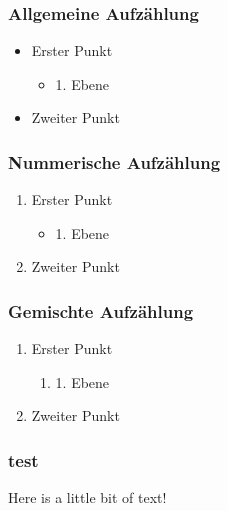 \subsubsection{Allgemeine Aufzählung}
\label{sec:Allgemeine Aufzählung}
\begin{itemize}
\item Erster Punkt
	\begin{itemize}
		\item 1. Ebene
	\end{itemize}
\item Zweiter Punkt
\end{itemize}

\subsubsection{Nummerische Aufzählung}
\label{sec:Nummerische Aufzählung}
\begin{enumerate} 
\item Erster Punkt
	\begin{itemize}
		\item 1. Ebene
	\end{itemize}
\item Zweiter Punkt
\end{enumerate}

\subsubsection{Gemischte Aufzählung}
\label{sec:Gemischte Aufzählung}
\begin{enumerate} 
	\item Erster Punkt
	\begin{enumerate}
		\item 1. Ebene
	\end{enumerate}
	\item Zweiter Punkt
\end{enumerate}

\subsubsection{test}
\label{sec:test}
Here is a little bit of text! \cite{XSSPayloadbox}
